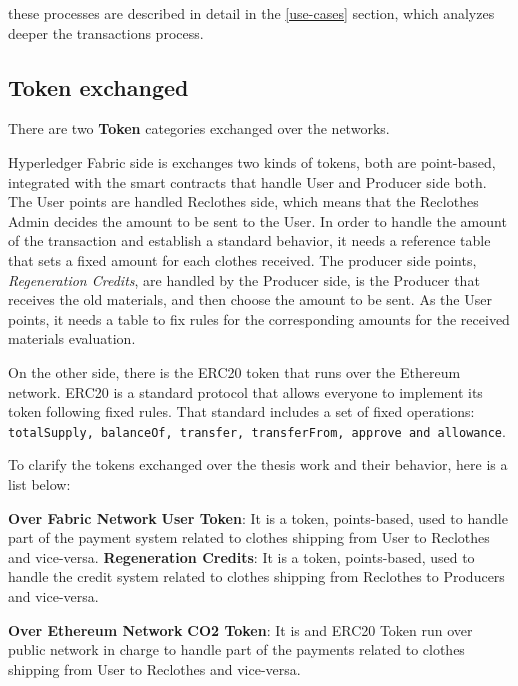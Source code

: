 these processes are described in detail in the \ref{use-cases} section, which analyzes 
deeper the transactions process. 

\subsection{Token exchanged}

There are two \textbf{Token} categories exchanged over the networks. 
\bigskip

Hyperledger Fabric side is exchanges two kinds of tokens, both are point-based, integrated with the smart 
contracts that handle User and Producer side both. The User points are handled Reclothes side, which means that 
the Reclothes Admin decides the amount to be sent to the User. 
In order to handle the amount of the transaction and establish a standard behavior, it needs a reference table that 
sets a fixed amount for each clothes received. The producer side points, \textit{Regeneration Credits}, are 
handled by the Producer side, is the Producer that receives the old materials, and then choose the amount to 
be sent. As the User points, it needs a table to fix rules for the corresponding amounts for the received 
materials evaluation. 
\bigskip

On the other side, there is the ERC20 token that runs over the Ethereum network. ERC20 is a standard 
protocol that allows everyone to implement its token following fixed rules. That standard includes a 
set of fixed operations: \texttt{totalSupply, balanceOf, transfer, transferFrom, approve 
and allowance}. 

\bigskip
To clarify the tokens exchanged over the thesis work and their behavior, here is a list below:

\begin{outline}[enumerate]
	\1 \textbf{Over Fabric Network}
    \2 \textbf{User Token}: It is a token, points-based, used to handle part of the payment system related to clothes
    shipping from User to Reclothes and vice-versa.
    \2 \textbf{Regeneration Credits}: It is a token, points-based, used to handle the credit system related to clothes
    shipping from Reclothes to Producers and vice-versa.

    \1 \textbf{Over Ethereum Network}
    \2 \textbf{CO2 Token}: It is and ERC20 Token run over public network in charge to handle part of the payments related 
    to clothes shipping from User to Reclothes and vice-versa.
\end{outline}


